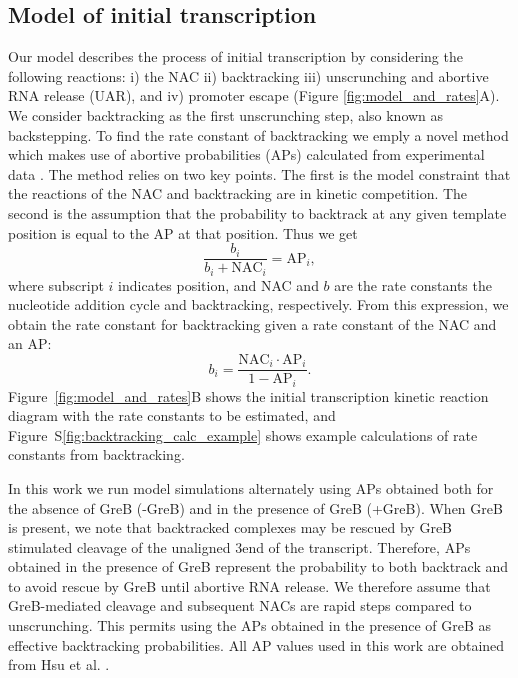 %
\subsection{Model of initial transcription}
Our model describes the process of initial transcription by considering the
following reactions: i) the NAC ii) backtracking iii) unscrunching and abortive
RNA release (UAR), and iv) promoter escape (Figure
\ref{fig:model_and_rates}A). We consider backtracking as the first
unscrunching step, also known as backstepping. To find the rate constant of
backtracking we emply a novel method which makes use of abortive probabilities
(APs) calculated from experimental data \cite{hsu_quantitative_1996}. The
method relies on two key points. The first is the model constraint that the
reactions of the NAC and backtracking are in kinetic competition. The second
is the assumption that the probability to backtrack at any given template
position is equal to the AP at that position. Thus we get
\begin{equation*}
    \frac{b_i}{b_i + \text{NAC}_i} = \text{AP}_i,
\end{equation*}
where subscript $i$ indicates position, and NAC and $b$ are the rate constants
the nucleotide addition cycle and backtracking, respectively. From this
expression, we obtain the rate constant for backtracking given a rate constant
of the NAC and an AP:
\begin{equation}
  b_i = \frac{\text{NAC}_i\cdot\text{AP}_i}{1-\text{AP}_i}.
  \label{eq:backtrackingcalc}
\end{equation}
Figure~\ref{fig:model_and_rates}B shows the initial transcription kinetic
reaction diagram with the rate constants to be estimated, and
Figure~S\ref{fig:backtracking_calc_example} shows example calculations of rate
constants from backtracking.

In this work we run model simulations alternately using APs obtained both for
the absence of GreB (-GreB) and in the presence of GreB (+GreB). When GreB is
present, we note that backtracked complexes may be rescued by GreB stimulated
cleavage of the unaligned 3\ppp end of the transcript. Therefore, APs obtained
in the presence of GreB represent the probability to both backtrack and to
avoid rescue by GreB until abortive RNA release. We therefore assume that
GreB-mediated cleavage and subsequent NACs are rapid steps compared to
unscrunching. This permits using the APs obtained in the presence of GreB as
effective backtracking probabilities. All AP values used in this work are
obtained from Hsu et al. \cite{hsu_initial_2006}.

